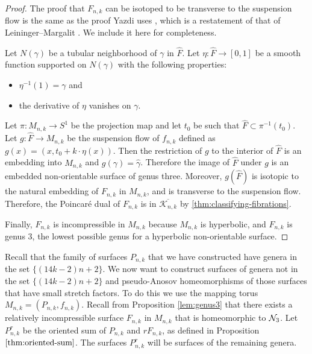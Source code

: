 \begin{proof}

  The proof that $F_{n,k}$ can be isotoped to be transverse to the suspension flow is the same as the
  proof Yazdi uses \cite{yazdi2018pseudo}, which is a restatement of that of Leininger--Margalit \cite{leininger2013number}. We include it here for completeness.

  Let $N(\gamma)$ be a tubular neighborhood of $\gamma$ in $\widehat{F}$.  Let $\eta: \widehat{F} \xrightarrow{} [0,1]$ be a smooth function supported on $N(\gamma)$ with the following properties:
  \begin{itemize}
      \item $\eta^{-1}(1) = \gamma$ and
      \item the derivative of $\eta$ vanishes on $\gamma$.
    \end{itemize}
Let $\pi:M_{n,k}\rightarrow S^1$ be the projection map and let $t_0$ be such that $\widehat{F}\subset\pi^{-1}(t_0)$.  Let $g: \widehat{F} \xrightarrow{} M_{n,k}$ be the suspension flow of $f_{n,k}$ defined as $g(x) =(x,t_0+k\cdot\eta(x))$. Then the restriction of $g$ to the interior of $\widehat{F}$ is an embedding into $M_{n,k}$ and $g(\gamma) = \widehat{\gamma}$. Therefore the image of $\widehat{F}$ under $g$ is an embedded non-orientable surface of genus three. Moreover, $g(\widehat{F})$ is isotopic to the natural embedding of $F_{n,k}$ in $M_{n,k}$, and is transverse to the suspension flow.
  Therefore, the Poincar\'e dual of $F_{n,k}$ is in $\overline{\mathcal{K}_{n,k}}$ by \autoref{thm:classifying-fibrations}.

  Finally, $F_{n,k}$ is incompressible in $M_{n,k}$ because $M_{n,k}$ is hyperbolic, and $F_{n,k}$ is genus $3$, the
  lowest possible genus for a hyperbolic non-orientable surface.
\end{proof}



Recall that the family of surfaces $P_{n,k}$ that we have constructed have genera in the set $\{(14k-2)n+2\}$.
We now want to construct surfaces of genera not in the set $\{(14k-2)n+2\}$ and pseudo-Anosov homeomorphisms of those surfaces that have small stretch factors.  To do this we use the mapping torus $M_{n,k}= (P_{n,k},f_{n,k})$. Recall from Proposition \ref{lem:genus3} that there exists a relatively incompressible surface $F_{n,k}$ in $M_{n,k}$ that is homeomorphic to $\mathcal{N}_3$.  Let $P_{n,k}^r$ be the oriented sum of $P_{n,k}$ and
$rF_{n,k}$, as defined in Proposition $\ref{thm:oriented-sum}$.  The surfaces $P_{n,k}^r$ will be surfaces of the remaining genera.

